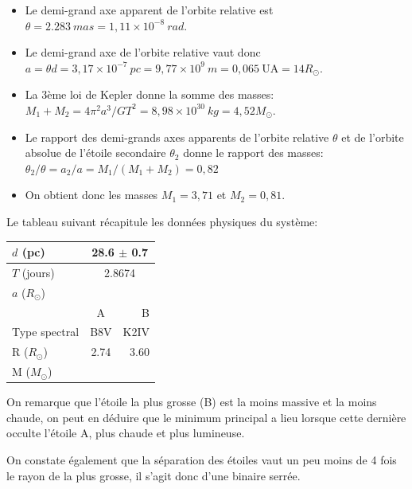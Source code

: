 \documentclass[a4paper,10pt]{report}
\newcommand{\UA}{\ensuremath{\textrm{UA}}}
\begin{document}
\begin{Answer}
  \begin{itemize}
  \item Le demi-grand axe apparent de l'orbite relative est $\theta =
    2.283~mas = 1,11 \times 10^{-8}~rad$.
  \item Le demi-grand axe de l'orbite relative vaut donc $a = \theta d
    = 3,17 \times 10^{-7}~pc = 9,77 \times 10^9~m = 0,065~\UA =
    14R_{\odot}$.
  \item La 3ème loi de Kepler donne la somme des masses:
    $M_1+M_2 = 4\pi^2 a^3/GT^2 = 8,98 \times 10^{30}~kg =
    4,52M_{\odot}$.
  \item Le rapport des demi-grands axes apparents de l'orbite relative
    $\theta$ et de l'orbite absolue de l'étoile secondaire $\theta_2$
    donne le rapport des masses: $\theta_2 / \theta = a_2 / a = M_1 /
    (M_1 + M_2) = 0,82$
  \item On obtient donc les masses $M_1 = 3,71$ et $M_2 = 0,81$.
  \end{itemize}

  Le tableau suivant récapitule les données physiques du système:
  \begin{center}
    \begin{tabular}{|l|c|r|}
      \hline
      $d$ (pc) & \multicolumn{2}{c|}{28.6 $\pm$ 0.7} \\
      \hline
      $T$ (jours) & \multicolumn{2}{c|}{2.8674} \\
      \hline
      $a$ ($R_{\odot}$) &  \multicolumn{2}{c|}{\color{red}{14}} \\
      \hline
      & A & B \\
      \cline{1-3}
      Type spectral & B8V & K2IV \\
      \hline
      R ($R_{\odot}$) & 2.74 & 3.60 \\
      \hline
      M ($M_{\odot}$) & \color{red}{3.71} & \color{red}{0.81} \\
      \hline
    \end{tabular}
  \end{center}
  On remarque que l'étoile la plus grosse (B) est la moins massive et
  la moins chaude, on peut en déduire que le minimum principal a lieu
  lorsque cette dernière occulte l'étoile A, plus chaude et plus
  lumineuse.

  On constate également que la séparation des étoiles vaut un peu
  moins de 4 fois le rayon de la plus grosse, il s'agit donc d'une
  binaire serrée.
\end{Answer}
\end{document}
